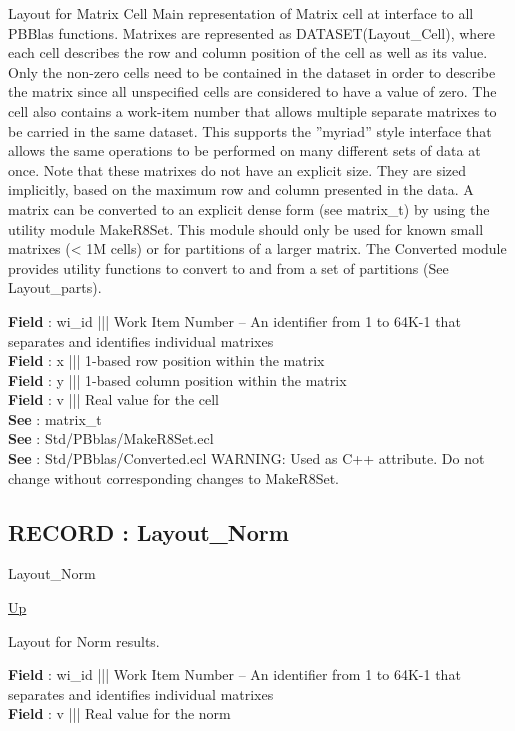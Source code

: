 \par
Layout for Matrix Cell Main representation of Matrix cell at interface to all PBBlas functions. Matrixes are represented as DATASET(Layout\_Cell), where each cell describes the row and column position of the cell as well as its value. Only the non-zero cells need to be contained in the dataset in order to describe the matrix since all unspecified cells are considered to have a value of zero. The cell also contains a work-item number that allows multiple separate matrixes to be carried in the same dataset. This supports the ''myriad'' style interface that allows the same operations to be performed on many different sets of data at once. Note that these matrixes do not have an explicit size. They are sized implicitly, based on the maximum row and column presented in the data. A matrix can be converted to an explicit dense form (see matrix\_t) by using the utility module MakeR8Set. This module should only be used for known small matrixes (< 1M cells) or for partitions of a larger matrix. The Converted module provides utility functions to convert to and from a set of partitions (See Layout\_parts).
\par
\textbf{Field} : wi\_id ||| Work Item Number -- An identifier from 1 to 64K-1 that separates and identifies individual matrixes \\
\textbf{Field} : x ||| 1-based row position within the matrix \\
\textbf{Field} : y ||| 1-based column position within the matrix \\
\textbf{Field} : v ||| Real value for the cell \\
\textbf{See} : matrix\_t \\
\textbf{See} : Std/PBblas/MakeR8Set.ecl \\
\textbf{See} : Std/PBblas/Converted.ecl WARNING: Used as C++ attribute. Do not change without corresponding changes to MakeR8Set. \\
\subsection*{RECORD : Layout\_Norm}
\hypertarget{ecldoc:pbblas.types.layout_norm}{}
\begin{minipage}[t]{\textwidth}
\begin{flushleft}
 Layout\_Norm 
\end{flushleft}
\end{minipage}
\hyperlink{ecldoc:PBblas.Types}{Up}

\par
Layout for Norm results.
\par
\textbf{Field} : wi\_id ||| Work Item Number -- An identifier from 1 to 64K-1 that separates and identifies individual matrixes \\
\textbf{Field} : v ||| Real value for the norm \\

